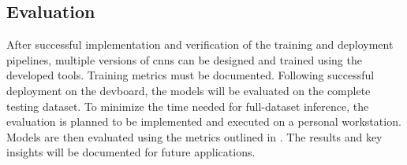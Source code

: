 {\subsection*{Evaluation}

After successful implementation and verification of the training and deployment pipelines,
multiple versions of \glspl{cnn} can be designed and trained using the developed tools.
Training metrics must be documented. Following successful deployment on the \gls{devboard},
the models will be evaluated on the complete testing dataset.
To minimize the time needed for full-dataset inference, the evaluation is planned to be implemented and executed on a personal workstation.
Models are then evaluated using the metrics outlined in .
The results and key insights will be documented for future applications.

}